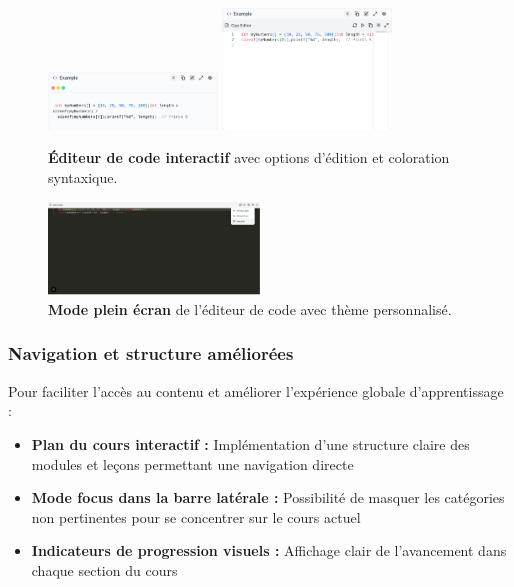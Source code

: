 \begin{figure}[H]
  \centering
  \includegraphics[width=0.4\textwidth,keepaspectratio]{old-reports/week_4_img/pre_edit.jpeg}
  \includegraphics[width=0.4\textwidth,keepaspectratio]{old-reports/week_4_img/editmode.jpeg}
  \caption{\textbf{Éditeur de code interactif} avec options d'édition et coloration syntaxique.}
  \label{fig:code_editor}
\end{figure}

\begin{figure}[H]
  \centering
  \includegraphics[width=0.5\textwidth,keepaspectratio]{old-reports/week_4_img/expended.jpeg}
  \caption{\textbf{Mode plein écran} de l'éditeur de code avec thème personnalisé.}
  \label{fig:code_editor_fullscreen}
\end{figure}

\subsubsection{Navigation et structure améliorées}

Pour faciliter l'accès au contenu et améliorer l'expérience globale d'apprentissage :
\begin{itemize}
    \item \textbf{Plan du cours interactif :} Implémentation d'une structure claire des modules et leçons permettant une navigation directe
    \item \textbf{Mode focus dans la barre latérale :} Possibilité de masquer les catégories non pertinentes pour se concentrer sur le cours actuel
    \item \textbf{Indicateurs de progression visuels :} Affichage clair de l'avancement dans chaque section du cours
\end{itemize}

